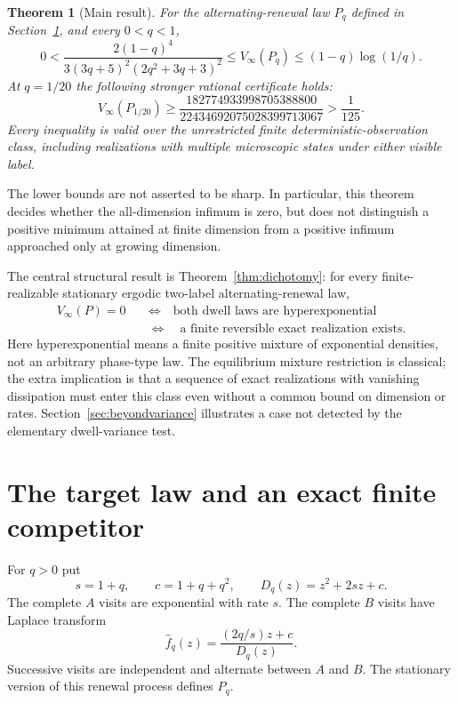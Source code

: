 \documentclass[11pt,a4paper]{article}
\newtheorem{theorem}{Theorem}
\begin{document}
\begin{theorem}[Main result]\label{thm:main}
For the alternating-renewal law $P_q$ defined in Section~\ref{sec:target}, and every $0<q<1$,
\begin{equation}\label{eq:allq}
0<\frac{2(1-q)^4}{3(3q+5)^2(2q^2+3q+3)^2}
\leq V_\infty(P_q)\leq(1-q)\log(1/q).
\end{equation}
At $q=1/20$ the following stronger rational certificate holds:
\begin{equation}\label{eq:mainconstant}
V_\infty(P_{1/20})\geq
\frac{182774933998705388800}{22434692075028399713067}
>\frac1{125}.
\end{equation}
Every inequality is valid over the unrestricted finite deterministic-observation class, including realizations with multiple microscopic states under either visible label.
\end{theorem}

The lower bounds are not asserted to be sharp. In particular, this theorem decides whether the all-dimension infimum is zero, but does not distinguish a positive minimum attained at finite dimension from a positive infimum approached only at growing dimension.

The central structural result is Theorem~\ref{thm:dichotomy}: for every finite-realizable stationary ergodic two-label alternating-renewal law,
\[
\begin{aligned}
V_\infty(P)=0
&\quad\Longleftrightarrow\quad\text{both dwell laws are hyperexponential}\\
&\quad\Longleftrightarrow\quad\text{a finite reversible exact realization exists}.
\end{aligned}
\]
Here hyperexponential means a finite positive mixture of exponential densities, not an arbitrary phase-type law. The equilibrium mixture restriction is classical; the extra implication is that a sequence of exact realizations with vanishing dissipation must enter this class even without a common bound on dimension or rates. Section~\ref{sec:beyondvariance} illustrates a case not detected by the elementary dwell-variance test.

\section{The target law and an exact finite competitor}\label{sec:target}
For $q>0$ put
\[
 s=1+q,\qquad c=1+q+q^2,\qquad
 D_q(z)=z^2+2sz+c.
\]
The complete $A$ visits are exponential with rate $s$. The complete $B$ visits have Laplace transform
\begin{equation}\label{eq:f}
 \widehat f_q(z)=\frac{(2q/s)z+c}{D_q(z)}.
\end{equation}
Successive visits are independent and alternate between $A$ and $B$. The stationary version of this renewal process defines $P_q$.
\end{document}
